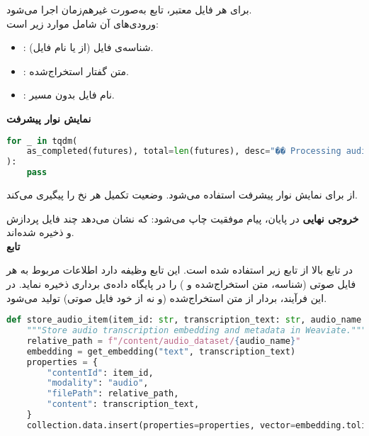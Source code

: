 \documentclass{article}
\begin{document}
برای هر فایل معتبر، تابع  به‌صورت غیرهم‌زمان اجرا می‌شود.\\  
 ورودی‌های آن شامل موارد زیر است:  
\begin{itemize}
    \item {}: شناسه‌ی فایل (از  یا نام فایل).  
    \item {}: متن گفتار استخراج‌شده.  
    \item {}: نام فایل بدون مسیر.  
\end{itemize}

\textbf{نمایش نوار پیشرفت}

\begin{latin}
\begin{lstlisting}[language=Python]
for _ in tqdm(
    as_completed(futures), total=len(futures), desc="�� Processing audios"
):
    pass
\end{lstlisting}
\end{latin}

از  برای نمایش نوار پیشرفت استفاده می‌شود.  
 وضعیت تکمیل هر نخ را پیگیری می‌کند.  


\textbf{خروجی نهایی}
در پایان، پیام موفقیت چاپ می‌شود:  
که نشان می‌دهد چند فایل پردازش و ذخیره شده‌اند.  \\

\textbf{تابع }

در تابع بالا از تابع زیر استفاده شده است. 
این تابع وظیفه دارد اطلاعات مربوط به هر فایل صوتی (شناسه، متن استخراج‌شده و ) را در پایگاه داده‌ی برداری  ذخیره نماید.  
در این فرآیند، بردار  از متن استخراج‌شده (و نه از خود فایل صوتی) تولید می‌شود.

\begin{latin}
\begin{lstlisting}[language=Python]
def store_audio_item(item_id: str, transcription_text: str, audio_name: str = ""):
    """Store audio transcription embedding and metadata in Weaviate."""
    relative_path = f"/content/audio_dataset/{audio_name}"
    embedding = get_embedding("text", transcription_text)
    properties = {
        "contentId": item_id,
        "modality": "audio",
        "filePath": relative_path,
        "content": transcription_text,
    }
    collection.data.insert(properties=properties, vector=embedding.tolist())
\end{lstlisting}
\end{latin}
\end{document}
